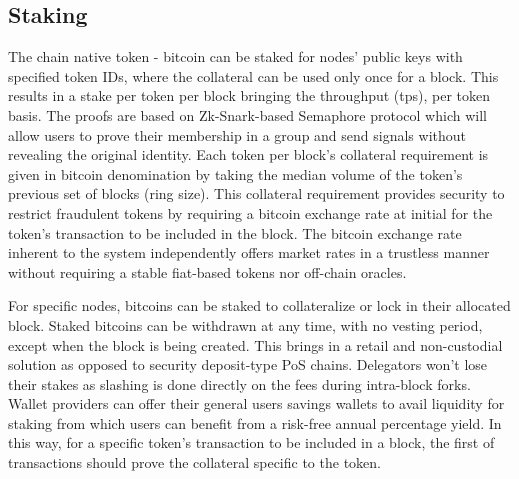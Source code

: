 \documentclass[a4paper, 10pt]{extarticle}
\begin{document}
\subsection{Staking}
The chain native token - bitcoin can be staked for nodes' public keys with specified token IDs, where the collateral can be used only once for a block. This results in a stake per token per block bringing the throughput (tps), per token basis. The proofs are based on Zk-Snark-based Semaphore protocol \cite{semaphore} which will allow users to prove their membership in a group and send signals without revealing the original identity. Each token per block's collateral requirement is given in bitcoin denomination by taking the median volume of the token's previous set of blocks (ring size). This collateral requirement provides security to restrict fraudulent tokens by requiring a bitcoin exchange rate at initial for the token's transaction to be included in the block. The bitcoin exchange rate inherent to the system independently offers market rates in a trustless manner without requiring a stable fiat-based tokens nor off-chain oracles. 

For specific nodes, bitcoins can be staked to collateralize or lock in their allocated block. Staked bitcoins can be withdrawn at any time, with no vesting period, except when the block is being created. This brings in a retail and non-custodial solution as opposed to security deposit-type PoS chains. Delegators won't lose their stakes as slashing is done directly on the fees during intra-block forks. Wallet providers can offer their general users savings wallets to avail liquidity for staking from which users can benefit from a risk-free annual percentage yield. In this way, for a specific token's transaction to be included in a block, the first of transactions should prove the collateral specific to the token.
\end{document}
